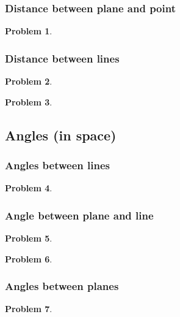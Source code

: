 \documentclass{article}
\newtheorem{problem}{Problem}
\begin{document}
\subsubsection{Distance between plane and point}
\begin{problem}

\end{problem}

\subsubsection{Distance between lines}
\begin{problem}

\end{problem}
\begin{problem}

\end{problem}



\subsection{Angles (in space)}
\subsubsection{Angles between lines}
\begin{problem}

\end{problem}

\subsubsection{Angle between plane and line}
\begin{problem}

\end{problem}

\begin{problem}

\end{problem}

\subsubsection{Angles between planes}
\begin{problem}

\end{problem}
\end{document}
